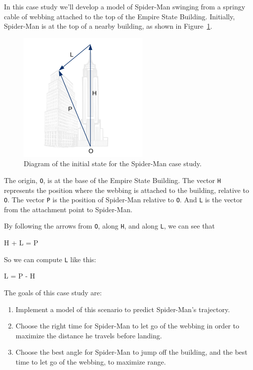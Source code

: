 \documentclass[
]{book}
\numberwithin{Answer}{chapter}
\numberwithin{Exercise}{chapter}
\begin{document}
In this case study we'll develop a model of Spider-Man swinging from a
springy cable of webbing attached to the top of the Empire State
Building.  Initially, Spider-Man is at the top of a nearby building, as
shown in Figure~\ref{spiderman}.


\begin{figure}
\centerline{\includegraphics[height=2.5in]{book/figs/spiderman.pdf}}
\caption{Diagram of the initial state for the Spider-Man case study.}
\label{spiderman}
\end{figure}

The origin, {\tt O}, is at the base of the Empire State Building. The
vector {\tt H} represents the position where the webbing is attached
to the building, relative to {\tt O}. The vector {\tt P} is the
position of Spider-Man relative to {\tt O}. And {\tt L} is the
vector from the attachment point to Spider-Man.


By following the arrows from {\tt O}, along {\tt H}, and along
{\tt L}, we can see that

\begin{code}
H + L = P
\end{code}

So we can compute {\tt L} like this:

\begin{code}
L = P - H
\end{code}

The goals of this case study are:

\begin{enumerate}

\item
  Implement a model of this scenario to predict Spider-Man's trajectory.


\item
  Choose the right time for Spider-Man to let go of the webbing in order
  to maximize the distance he travels before landing.


\item
  Choose the best angle for Spider-Man to jump off the building, and the best time to let go of the webbing, to maximize range.

  
\end{enumerate}
\end{document}

